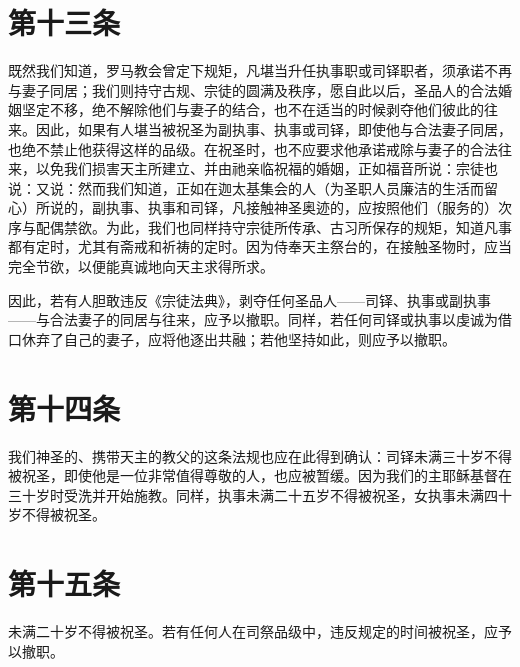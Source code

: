 
\section{第十三条}

既然我们知道，罗马教会曾定下规矩，凡堪当升任执事职或司铎职者，须承诺不再与妻子同居；我们则持守古规、宗徒的圆满及秩序，愿自此以后，圣品人的合法婚姻坚定不移，绝不解除他们与妻子的结合，也不在适当的时候剥夺他们彼此的往来。因此，如果有人堪当被祝圣为副执事、执事或司铎，即使他与合法妻子同居，也绝不禁止他获得这样的品级。在祝圣时，也不应要求他承诺戒除与妻子的合法往来，以免我们损害天主所建立、并由祂亲临祝福的婚姻，正如福音所说：宗徒也说：又说：然而我们知道，正如在迦太基集会的人（为圣职人员廉洁的生活而留心）所说的，副执事、执事和司铎，凡接触神圣奥迹的，应按照他们（服务的）次序与配偶禁欲。为此，我们也同样持守宗徒所传承、古习所保存的规矩，知道凡事都有定时，尤其有斋戒和祈祷的定时。因为侍奉天主祭台的，在接触圣物时，应当完全节欲，以便能真诚地向天主求得所求。\par

因此，若有人胆敢违反《宗徒法典》，剥夺任何圣品人——司铎、执事或副执事——与合法妻子的同居与往来，应予以撤职。同样，若任何司铎或执事以虔诚为借口休弃了自己的妻子，应将他逐出共融；若他坚持如此，则应予以撤职。\par


\section{第十四条}

我们神圣的、携带天主的教父的这条法规也应在此得到确认：司铎未满三十岁不得被祝圣，即使他是一位非常值得尊敬的人，也应被暂缓。因为我们的主耶稣基督在三十岁时受洗并开始施教。同样，执事未满二十五岁不得被祝圣，女执事未满四十岁不得被祝圣。\par


\section{第十五条}

未满二十岁不得被祝圣。若有任何人在司祭品级中，违反规定的时间被祝圣，应予以撤职。\par


